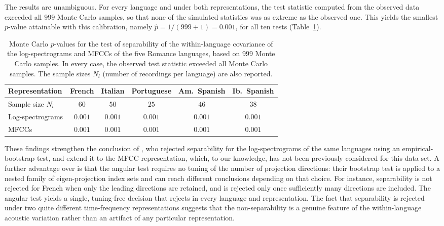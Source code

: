 \documentclass[12pt]{article}
\begin{document}
The results are unambiguous. For every language and under both representations, the test statistic computed from the observed data exceeded all $999$ Monte Carlo samples, so that none of the simulated statistics was as extreme as the observed one. This yields the smallest $p$-value attainable with this calibration, namely $\widehat{p} = 1/(999+1) = 0.001$,
for all ten tests (Table~\ref{tab:phonetics}).

\begin{table}[t]
	\centering
	\caption{Monte Carlo $p$-values for the test of separability of the within-language covariance of the log-spectrograms and MFCCs of the five Romance languages, based on $999$ Monte Carlo samples. In every case, the observed test statistic exceeded all Monte Carlo samples. The sample sizes $N_l$ (number of recordings per language) are also reported.}

    \smallskip
	\label{tab:phonetics}
	\begin{tabular}{lccccc}
		\toprule
		Representation & French & Italian & Portuguese & Am.\ Spanish & Ib.\ Spanish \\
		\midrule
		Sample size $N_l$ & $60$ & $50$ & $25$ & $46$ & $38$ \\
		\midrule
        Log-spectrograms & $ 0.001$ & $ 0.001$ & $ 0.001$ & $ 0.001$ & $ 0.001$ \\
		MFCCs            & $ 0.001$ & $ 0.001$ & $ 0.001$ & $ 0.001$ & $ 0.001$ \\
		\bottomrule
	\end{tabular}
\end{table}

These findings strengthen the conclusion of \citet{aston2017tests}, who rejected separability for the log-spectrograms of the same languages using an empirical-bootstrap test, and extend it to the MFCC representation, which, to our knowledge, has not been previously considered for this data set. A further advantage over \citet{aston2017tests} is that the angular test requires no tuning of the number of projection directions: their bootstrap test is applied to a nested family of eigen-projection index sets and can reach different conclusions depending on that choice. For instance, separability is not rejected for French when only the leading directions are retained, and is rejected only once sufficiently many directions are included. The angular test yields a single, tuning-free decision that rejects in every language and representation. The fact that separability is rejected under two quite different time-frequency representations suggests that the non-separability is a genuine feature of the within-language acoustic variation rather than an artifact of any particular representation.
\end{document}

